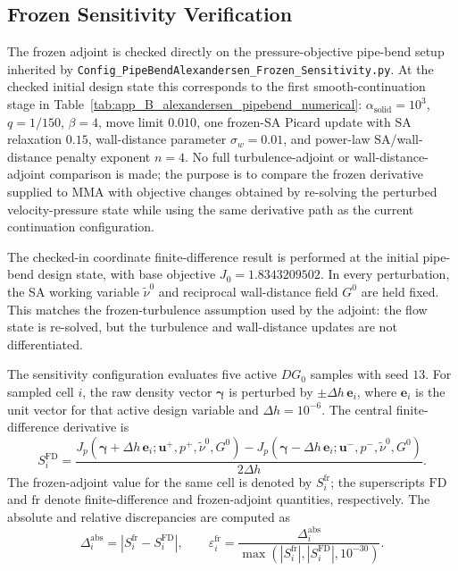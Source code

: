 \subsection{Frozen Sensitivity Verification}
\label{subsec:alexandersen_pipebend_sensitivity}
		The frozen adjoint is checked directly on the pressure-objective pipe-bend setup inherited by \texttt{Config\_PipeBendAlexandersen\_Frozen\_Sensitivity.py}. At the checked initial design state this corresponds to the first smooth-continuation stage in Table~\ref{tab:app_B_alexandersen_pipebend_numerical}: $\alpha_{\mathrm{solid}}=10^3$, $q=1/150$, $\beta=4$, move limit $0.010$, one frozen-SA Picard update with SA relaxation $0.15$, wall-distance parameter $\sigma_w=0.01$, and power-law SA/wall-distance penalty exponent $n=4$. No full turbulence-adjoint or wall-distance-adjoint comparison is made; the purpose is to compare the frozen derivative supplied to MMA with objective changes obtained by re-solving the perturbed velocity-pressure state while using the same derivative path as the current continuation configuration.

	The checked-in coordinate finite-difference result is performed at the initial pipe-bend design state, with base objective
	$J_0=1.8343209502$. In every perturbation, the SA working variable $\tilde{\nu}^{0}$ and reciprocal wall-distance field $G^{0}$ are held fixed. This matches the frozen-turbulence assumption used by the adjoint: the flow state is re-solved, but the turbulence and wall-distance updates are not differentiated.

	The sensitivity configuration evaluates five active $DG_0$ samples with seed $13$. For sampled cell $i$, the raw density vector $\boldsymbol{\gamma}$ is perturbed by $\pm\Delta h\,\mathbf{e}_i$, where $\mathbf{e}_i$ is the unit vector for that active design variable and $\Delta h=10^{-6}$. The central finite-difference derivative is
\begin{equation}
	S_i^{\mathrm{FD}}
	=
	\frac{
			J_p\!\left(\boldsymbol{\gamma}+\Delta h\,\mathbf{e}_i;
			\mathbf{u}^{+},p^{+},\tilde{\nu}^{0},G^{0}\right)
		-
			J_p\!\left(\boldsymbol{\gamma}-\Delta h\,\mathbf{e}_i;
			\mathbf{u}^{-},p^{-},\tilde{\nu}^{0},G^{0}\right)
	}{
		2\Delta h
	}.
	\label{eq:alexandersen_pipebend_fd_metric}
\end{equation}
The frozen-adjoint value for the same cell is denoted by $S_i^{\mathrm{fr}}$; the superscripts $\mathrm{FD}$ and $\mathrm{fr}$ denote finite-difference and frozen-adjoint quantities, respectively. The absolute and relative discrepancies are computed as
\begin{equation}
	\Delta_i^{\mathrm{abs}} =
	\left|S_i^{\mathrm{fr}}-S_i^{\mathrm{FD}}\right|,
	\qquad
	\varepsilon_i^{\mathrm{fr}}
	=
	\frac{\Delta_i^{\mathrm{abs}}}
	{\max\!\left(\left|S_i^{\mathrm{fr}}\right|,\left|S_i^{\mathrm{FD}}\right|,10^{-30}\right)} .
	\label{eq:alexandersen_pipebend_fd_relative_error}
\end{equation}

